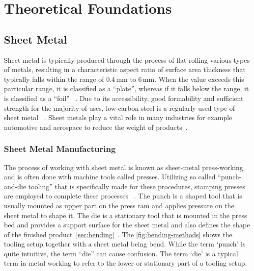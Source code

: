 \chapter{Theoretical Foundations}\label{ch:theoretical-foundations}


\section{Sheet Metal}\label{sec:sheet-metal}
Sheet metal is typically produced through the process of flat rolling various types of metals, resulting in a
characteristic aspect ratio of surface area thickness that typically falls within the range of
0.4\,mm to 6\,mm.
When the value exceeds this particular range, it is classified as a ``plate'', whereas if it falls below the range,
it is classified as a ``foil''
~\cite[p. 405]{groover2020fundamentals}.
Due to its accessibility, good formability and sufficient strength for the majority of uses, low-carbon steel is a
regularly used type of sheet metal
~\cite[p. 405]{groover2020fundamentals}.
Sheet metals play a vital role in many industries for example automotive and aerospace to reduce the weight of
products~\cite[p. 1]{zheng_reviewformingtechniques_2018}.

\subsection{Sheet Metal Manufacturing}\label{subsec:sheet-metal-manufacturing}
The process of working with sheet metal is known as sheet-metal press-working and is often done with machine tools
called presses.
Utilizing so called ``punch-and-die tooling'' that is specifically made for these procedures, stamping presses are
employed to complete these processes
~\cite[p. 405]{groover2020fundamentals}.
The punch is a shaped tool that is usually mounted as upper part on the press ram and applies
pressure on the sheet metal to shape it.
The die is a stationary tool that is mounted in the press bed and provides a support surface for
the sheet metal and also defines the shape of the finished
product~\cref{sec:bending}~\cite[p. 412]{groover2020fundamentals}.
The \cref{fig:bending-methods} shows the tooling setup together with a sheet metal being bend.
While the term `punch' is quite intuitive, the term ``die'' can cause confusion.
The term `die' is a typical term in metal working to refer to the lower or stationary part of a tooling setup.

